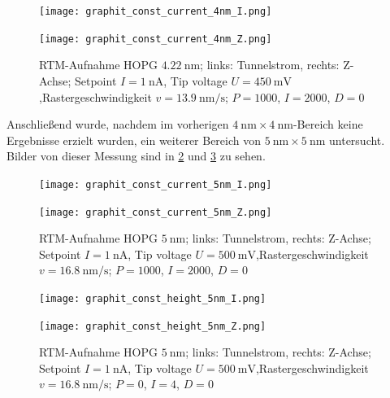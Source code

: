 \begin{figure}[H]
    \centering
    \begin{minipage}[t]{0.495\textwidth}
        \centering
        \texttt{[image: graphit\_const\_current\_4nm\_I.png]}
    \end{minipage}
    \hfill
    \begin{minipage}[t]{0.495\textwidth}
        \centering
        \texttt{[image: graphit\_const\_current\_4nm\_Z.png]}
    \end{minipage}
    \caption{
      RTM-Aufnahme HOPG $\SI{4.22}{\nm}$; links: Tunnelstrom, rechts: Z-Achse; Setpoint $I = \SI{1}{\nano\ampere}$, Tip voltage $U = \SI{450}{\milli\volt}$,Rastergeschwindigkeit $v = \SI{13.9}{\nano\meter\per\second}$; $P = 1000$, $I = 2000$, $D = 0$
}
    \label{fig:4nmCC}
\end{figure}

Anschließend wurde, nachdem im vorherigen $\SI{4}{\nm} \times \SI{4}{\nm}$-Bereich keine Ergebnisse erzielt wurden, ein weiterer Bereich von $\SI{5}{\nm} \times \SI{5}{\nm}$ untersucht. Bilder von dieser Messung sind in \cref{fig:5nmCC} und \cref{fig:5nmCH} zu sehen.

\begin{figure}[H]
    \centering
    \begin{minipage}[t]{0.495\textwidth}
        \centering
        \texttt{[image: graphit\_const\_current\_5nm\_I.png]}
    \end{minipage}
    \hfill
    \begin{minipage}[t]{0.495\textwidth}
        \centering
        \texttt{[image: graphit\_const\_current\_5nm\_Z.png]}
    \end{minipage}
    \caption{
      RTM-Aufnahme HOPG $\SI{5}{\nm}$; links: Tunnelstrom, rechts: Z-Achse; Setpoint $I = \SI{1}{\nano\ampere}$, Tip voltage $U = \SI{500}{\milli\volt}$,Rastergeschwindigkeit $v = \SI{16.8}{\nano\meter\per\second}$; $P = 1000$, $I = 2000$, $D = 0$
}
    \label{fig:5nmCC}
\end{figure}

\begin{figure}[H]
    \centering
    \begin{minipage}[t]{0.495\textwidth}
        \centering
        \texttt{[image: graphit\_const\_height\_5nm\_I.png]}
    \end{minipage}
    \hfill
    \begin{minipage}[t]{0.495\textwidth}
        \centering
        \texttt{[image: graphit\_const\_height\_5nm\_Z.png]}
    \end{minipage}
    \caption{
      RTM-Aufnahme HOPG $\SI{5}{\nm}$; links: Tunnelstrom, rechts: Z-Achse; Setpoint $I = \SI{1}{\nano\ampere}$, Tip voltage $U = \SI{500}{\milli\volt}$,Rastergeschwindigkeit $v = \SI{16.8}{\nano\meter\per\second}$; $P = 0$, $I = 4$, $D = 0$
}
    \label{fig:5nmCH}
\end{figure}




